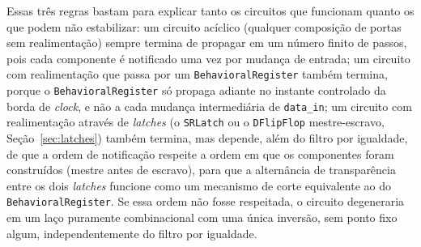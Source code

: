 Essas três regras bastam para explicar tanto os circuitos que funcionam quanto os que podem não estabilizar: um circuito acíclico (qualquer composição de portas sem realimentação) sempre termina de propagar em um número finito de passos, pois cada componente é notificado uma vez por mudança de entrada; um circuito com realimentação que passa por um \texttt{BehavioralRegister} também termina, porque o \texttt{BehavioralRegister} só propaga adiante no instante controlado da borda de \textit{clock}, e não a cada mudança intermediária de \texttt{data\_in}; um circuito com realimentação através de \textit{latches} (o \texttt{SRLatch} ou o \texttt{DFlipFlop} mestre-escravo, Seção~\ref{sec:latches}) também termina, mas depende, além do filtro por igualdade, de que a ordem de notificação respeite a ordem em que os componentes foram construídos (mestre antes de escravo), para que a alternância de transparência entre os dois \textit{latches} funcione como um mecanismo de corte equivalente ao do \texttt{BehavioralRegister}. Se essa ordem não fosse respeitada, o circuito degeneraria em um laço puramente combinacional com uma única inversão, sem ponto fixo algum, independentemente do filtro por igualdade.
